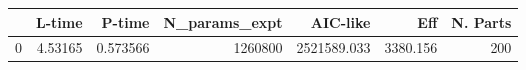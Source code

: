 \begin{tabular}{lrrrrrr}
\toprule
{} &   L-time &    P-time &  N\_params\_expt &     AIC-like &       Eff &  N. Parts \\
\midrule
0 &  4.53165 &  0.573566 &        1260800 &  2521589.033 &  3380.156 &       200 \\
\bottomrule
\end{tabular}
